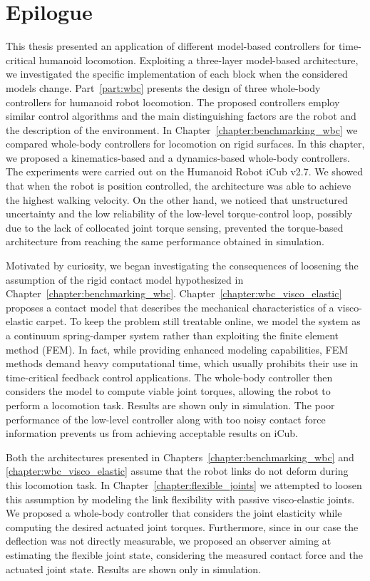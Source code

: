 \chapter*{Epilogue}
\lhead{\leftmark}
This thesis presented an application of different model-based controllers for time-critical humanoid locomotion. Exploiting a three-layer model-based architecture, we investigated the specific implementation of each block when the considered models change. Part~\ref{part:wbc} presents the design of three whole-body controllers for humanoid robot locomotion. The proposed controllers employ similar control algorithms and the main distinguishing factors are the robot and the description of the environment.
In Chapter~\ref{chapter:benchmarking_wbc} we compared whole-body controllers for locomotion on rigid surfaces. In this chapter, we proposed a kinematics-based and a dynamics-based whole-body controllers. The experiments were carried out on the Humanoid Robot iCub v2.7. We showed that when the robot is position controlled, the architecture was able to achieve the highest walking velocity. On the other hand, we noticed that unstructured uncertainty and the low reliability of the low-level torque-control loop, possibly due to the lack of collocated joint torque sensing, prevented the torque-based architecture from reaching the same performance obtained in simulation.
\par
Motivated by curiosity, we began investigating the consequences of loosening the assumption of the rigid contact model hypothesized in Chapter~\ref{chapter:benchmarking_wbc}. Chapter~\ref{chapter:wbc_visco_elastic} proposes a contact model that describes the mechanical characteristics of a visco-elastic carpet. To keep the problem still treatable online, we model the system as a continuum spring-damper system rather than exploiting the finite element method (FEM). In fact, while providing enhanced modeling capabilities, FEM methods demand heavy computational time, which usually prohibits their use in time-critical feedback control applications.
The whole-body controller then considers the model to compute viable joint torques, allowing the robot to perform a locomotion task.
Results are shown only in simulation. The poor performance of the low-level controller along with too noisy contact force information prevents us from achieving acceptable results on iCub.
\par
Both the architectures presented in Chapters~\ref{chapter:benchmarking_wbc} and \ref{chapter:wbc_visco_elastic} assume that the robot links do not deform during this locomotion task. In Chapter~\ref{chapter:flexible_joints} we attempted to loosen this assumption by modeling the link flexibility with passive visco-elastic joints. We proposed a whole-body controller that considers the joint elasticity while computing the desired actuated joint torques. Furthermore, since in our case the deflection was not directly measurable, we proposed an observer aiming at estimating the flexible joint state, considering the measured contact force and the actuated joint state. Results are shown only in simulation.
